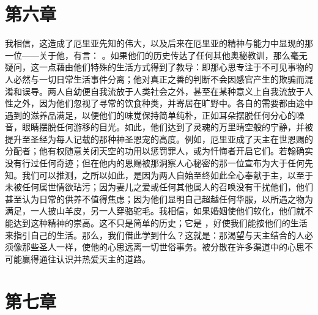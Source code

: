 
\section{第六章}

我相信，这造成了厄里亚先知的伟大，以及后来在厄里亚的精神与能力中显现的那一位——关于他，有言： 。如果他们的历史传达了任何其他奥秘教训，那么毫无疑问，这一点藉由他们特殊的生活方式得到了教导：即那心思专注于不可见事物的人必然与一切日常生活事件分离；他对真正之善的判断不会因感官产生的欺骗而混淆和误导。两人自幼便自我流放于人类社会之外，甚至在某种意义上自我流放于人性之外，因为他们忽视了寻常的饮食种类，并寄居在旷野中。各自的需要都由途中遇到的滋养品满足，以便他们的味觉保持简单纯朴，正如耳朵摆脱任何分心的噪音，眼睛摆脱任何游移的目光。如此，他们达到了灵魂的万里晴空般的宁静，并被提升至圣经为每人记载的那种神圣恩宠的高度。例如，厄里亚成了天主在世恩赐的分配者；他有权随意关闭天空的功用以惩罚罪人，或为忏悔者开启它们。若翰确实没有行过任何奇迹；但在他内的恩赐被那洞察人心秘密的那一位宣布为大于任何先知。我们可以推测，之所以如此，是因为两人自始至终如此全心奉献于主，以至于未被任何属世情欲玷污；因为妻儿之爱或任何其他属人的召唤没有干扰他们，他们甚至认为日常的供养不值得焦虑；因为他们显明自己超越任何华服，以所遇之物为满足，一人披山羊皮，另一人穿骆驼毛。我相信，如果婚姻使他们软化，他们就不能达到这种精神的崇高。这不只是简单的历史；它是 ，好使我们能按他们的生活来指引自己的生活。那么，我们借此学到什么？这就是：那渴望与天主结合的人必须像那些圣人一样，使他的心思远离一切世俗事务。被分散在许多渠道中的心思不可能赢得通往认识并热爱天主的道路。\par


\section{第七章}

